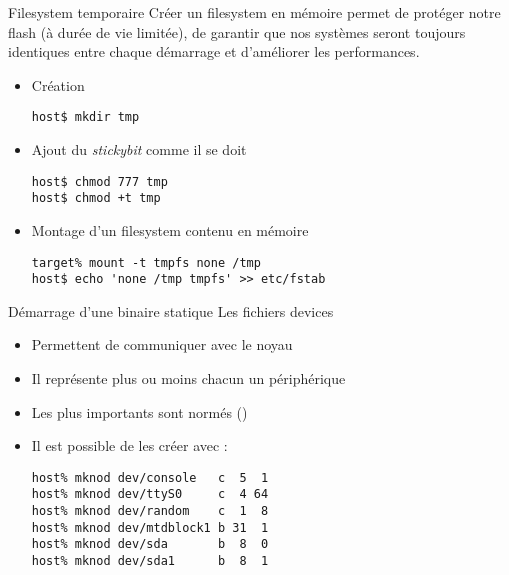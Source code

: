 \begin{frame}[fragile=singleslide]{Filesystem temporaire}
  Créer un  filesystem en  mémoire permet de  protéger notre  flash (à
  durée  de vie  limitée), de  garantir que  nos systèmes  seront toujours
  identiques entre chaque démarrage et d'améliorer les performances.
  \begin{itemize}
    \item Création
    \begin{lstlisting}
host$ mkdir tmp
    \end{lstlisting}
  \item Ajout du \emph{stickybit} comme il se doit
    \begin{lstlisting}
host$ chmod 777 tmp
host$ chmod +t tmp
    \end{lstlisting}
  \item Montage d'un filesystem contenu en mémoire
    \begin{lstlisting}
target% mount -t tmpfs none /tmp
host$ echo 'none /tmp tmpfs' >> etc/fstab
    \end{lstlisting}
  \end{itemize}
\end{frame}

\begin{frame}[fragile=singleslide]{Démarrage d'une binaire statique}
  Les fichiers devices
  \begin{itemize}
  \item Permettent de communiquer avec le noyau
  \item Il représente plus ou moins chacun un périphérique
  \item       Les       plus        importants       sont       normés
    ()
  \item Il est possible de les créer avec :
    \begin{lstlisting}
host% mknod dev/console   c  5  1
host% mknod dev/ttyS0     c  4 64
host% mknod dev/random    c  1  8
host% mknod dev/mtdblock1 b 31  1
host% mknod dev/sda       b  8  0
host% mknod dev/sda1      b  8  1
    \end{lstlisting}
  \end{itemize}
\end{frame}

